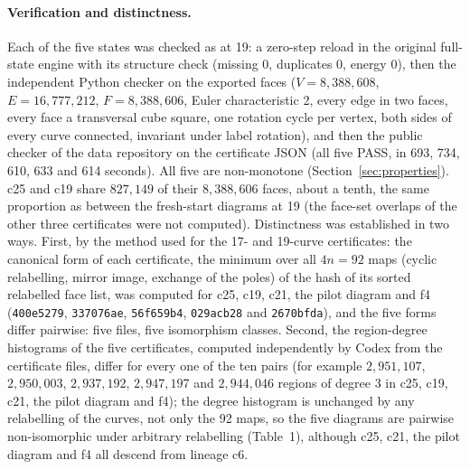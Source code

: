 \documentclass[11pt]{article}
\begin{document}
\paragraph{Verification and distinctness.} Each of the five states was checked as at 19: a zero-step reload in the
original full-state engine with its structure check (missing 0, duplicates 0, energy 0), then the independent Python
checker on the exported faces ($V=8{,}388{,}608$, $E=16{,}777{,}212$, $F=8{,}388{,}606$, Euler characteristic 2, every
edge in two faces, every face a transversal cube square, one rotation cycle per vertex, both sides of every curve
connected, invariant under label rotation), and then the public checker of the data repository on the certificate JSON
(all five PASS, in 693, 734, 610, 633 and 614 seconds). All five are non-monotone
(Section~\ref{sec:properties}).
c25 and c19 share
$827{,}149$ of their $8{,}388{,}606$ faces, about a tenth, the same proportion as between the fresh-start diagrams at
19 (the face-set overlaps of the other three certificates were not computed). Distinctness was established in two ways. First, by the method used for the 17- and 19-curve
certificates: the canonical form of each certificate, the minimum over all $4n=92$ maps (cyclic relabelling, mirror
image, exchange of the poles) of the hash of its sorted relabelled face list, was computed for c25, c19, c21, the
pilot diagram and f4 (\texttt{400e5279}, \texttt{337076ae}, \texttt{56f659b4}, \texttt{029acb28} and
\texttt{2670bfda}), and the five forms differ pairwise: five files, five isomorphism classes. Second, the
region-degree histograms of the five certificates, computed independently by Codex from the certificate files, differ
for every one of the ten pairs (for example $2{,}951{,}107$, $2{,}950{,}003$, $2{,}937{,}192$, $2{,}947{,}197$ and
$2{,}944{,}046$ regions of degree 3 in c25, c19, c21, the pilot diagram and f4); the degree histogram is unchanged by
any relabelling of the curves, not only the 92 maps, so the five diagrams are pairwise non-isomorphic under arbitrary
relabelling (Table~1), although c25, c21, the pilot diagram and f4 all descend from lineage c6.
\end{document}
